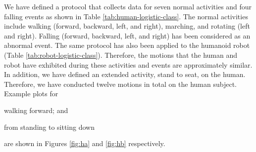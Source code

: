 \documentclass[letterpaper]{article}
\begin{document}
\begin{sloppy}
We have defined a protocol that collects data for seven normal activities and four falling events 
as 
shown in Table \ref{tab:human-logistic-class}. The normal activities include walking 
(forward, backward, left, and right), marching, and rotating (left and right). Falling  (forward, 
backward, left, and right) has been considered as an abnormal event.  The same protocol has also 
been applied to the 
humanoid robot (Table \ref{tab:robot-logistic-class}). Therefore, the motions that the human and 
robot have exhibited  during these activities and events are approximately similar. In addition, we 
have  defined an extended activity, stand to seat, on the human. Therefore, we have conducted 
twelve motions in total on the human subject.  Example plots for 
\begin{inparaenum}[1)] \item walking forward; and \item from standing to sitting 
down  \end{inparaenum}  are shown in Figures \ref{fig:ha} and \ref{fig:hb} respectively. 



\end{sloppy}
\end{document}
